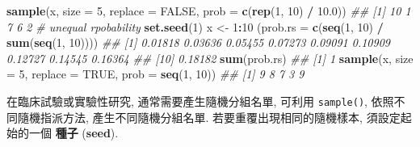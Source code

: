 \documentclass[
]{book}
\newenvironment{Shaded}{\begin{snugshade}}{\end{snugshade}}
\newcommand{\CommentTok}[1]{\textcolor[rgb]{0.56,0.35,0.01}{\textit{#1}}}
\newcommand{\DataTypeTok}[1]{\textcolor[rgb]{0.13,0.29,0.53}{#1}}
\newcommand{\DecValTok}[1]{\textcolor[rgb]{0.00,0.00,0.81}{#1}}
\newcommand{\FloatTok}[1]{\textcolor[rgb]{0.00,0.00,0.81}{#1}}
\newcommand{\KeywordTok}[1]{\textcolor[rgb]{0.13,0.29,0.53}{\textbf{#1}}}
\newcommand{\NormalTok}[1]{#1}
\newcommand{\OperatorTok}[1]{\textcolor[rgb]{0.81,0.36,0.00}{\textbf{#1}}}
\newcommand{\OtherTok}[1]{\textcolor[rgb]{0.56,0.35,0.01}{#1}}
\newcommand{\StringTok}[1]{\textcolor[rgb]{0.31,0.60,0.02}{#1}}
\begin{document}
\begin{Shaded}
\begin{Highlighting}[]
\KeywordTok{sample}\NormalTok{(x, }\DataTypeTok{size =} \DecValTok{5}\NormalTok{, }\DataTypeTok{replace =} \OtherTok{FALSE}\NormalTok{, }\DataTypeTok{prob =} \KeywordTok{c}\NormalTok{(}\KeywordTok{rep}\NormalTok{(}\DecValTok{1}\NormalTok{, }\DecValTok{10}\NormalTok{) }\OperatorTok{/}\StringTok{ }\FloatTok{10.0}\NormalTok{))}
\CommentTok{\#\# [1] 10  1  7  6  2}
\CommentTok{\# unequal rpobability}
\KeywordTok{set.seed}\NormalTok{(}\DecValTok{1}\NormalTok{)}
\NormalTok{x \textless{}{-}}\StringTok{ }\DecValTok{1}\OperatorTok{:}\DecValTok{10}
\NormalTok{(}\DataTypeTok{prob.rs =} \KeywordTok{c}\NormalTok{(}\KeywordTok{seq}\NormalTok{(}\DecValTok{1}\NormalTok{, }\DecValTok{10}\NormalTok{) }\OperatorTok{/}\StringTok{ }\KeywordTok{sum}\NormalTok{(}\KeywordTok{seq}\NormalTok{(}\DecValTok{1}\NormalTok{, }\DecValTok{10}\NormalTok{))))}
\CommentTok{\#\#  [1] 0.01818 0.03636 0.05455 0.07273 0.09091 0.10909 0.12727 0.14545 0.16364}
\CommentTok{\#\# [10] 0.18182}
\KeywordTok{sum}\NormalTok{(prob.rs)}
\CommentTok{\#\# [1] 1}
\KeywordTok{sample}\NormalTok{(x, }\DataTypeTok{size =} \DecValTok{5}\NormalTok{, }\DataTypeTok{replace =} \OtherTok{TRUE}\NormalTok{,  }\DataTypeTok{prob =} \KeywordTok{seq}\NormalTok{(}\DecValTok{1}\NormalTok{, }\DecValTok{10}\NormalTok{))}
\CommentTok{\#\# [1] 9 8 7 3 9}
\end{Highlighting}
\end{Shaded}

在臨床試驗或實驗性研究, 通常需要產生隨機分組名單,
可利用 \texttt{sample()}, 依照不同隨機指派方法, 產生不同隨機分組名單.
若要重覆出現相同的隨機樣本, 須設定起始的一個
\textbf{種子}
(\textbf{seed}).
\end{document}
